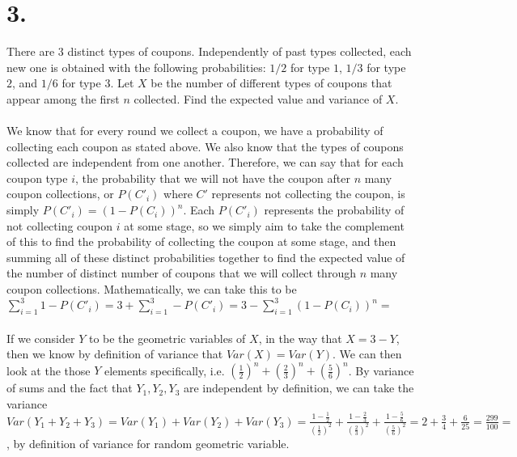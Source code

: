 \documentclass{article}
\begin{document}
\section*{3.}
{\Large 

There are 3 distinct types of coupons. Independently
of past types collected, each new one is obtained with the following probabilities: $1/2$ for type $1$, $1/3$ for type $2$, and $1/6$ for type $3$. Let $X$ be the number of different types of coupons that appear among the first $n$ collected. Find the expected value and variance of $X$. \\ \\
We know that for every round we collect a coupon, we have a probability of collecting each coupon as stated above. We also know that the types of coupons collected are independent from one another. Therefore, we can say that for each coupon type $i$, the probability that we will not have the coupon after $n$ many coupon collections, or $P(C'_i)$ where $C'$ represents not collecting the coupon, is simply $P(C'_i) = (1-P(C_i))^n$. Each $P(C'_i)$ represents the probability of not collecting coupon $i$ at some stage, so we simply aim to take the complement of this to find the probability of collecting the coupon at some stage, and then summing all of these distinct probabilities together to find the expected value of the number of distinct number of coupons that we will collect through $n$ many coupon collections. Mathematically, we can take this to be $\sum_{i = 1}^{3} 1 - P(C'_i) = 3 + \sum_{i=1}^{3} - P(C'_i) = 3 - \sum_{i=1}^{3} (1 - P(C_i))^n = $  \\ \\ 
If we consider $Y$ to be the geometric variables of $X$, in the way that $X = 3 - Y$, then we know by definition of variance that $Var(X) = Var(Y)$. We can then look at the those $Y$ elements specifically, i.e. $(\frac{1}{2})^n + (\frac{2}{3})^n + (\frac{5}{6})^n$. By variance of sums and the fact that $Y_1, Y_2, Y_3$ are independent by definition, we can take the variance $Var(Y_1 + Y_2 + Y_3) = Var(Y_1) + Var(Y_2) + Var(Y_3) = \frac{1-\frac{1}{2}}{(\frac{1}{2})^2} + \frac{1-\frac{2}{3}}{(\frac{2}{3})^2} + \frac{1-\frac{5}{6}}{(\frac{5}{6})^2} = 2 + \frac{3}{4} + \frac{6}{25} = \frac{299}{100} = $ , by definition of variance for random geometric variable.

}
\end{document}
